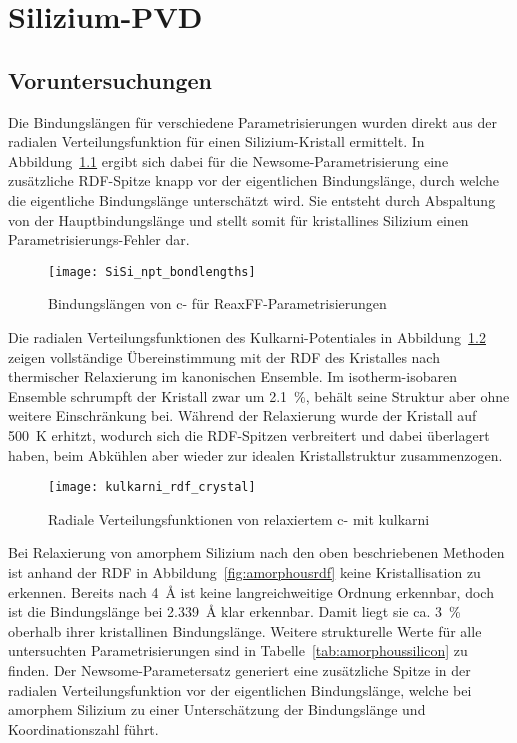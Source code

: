 \chapter{Silizium-PVD}
\label{appendix_silicon}


\section{Voruntersuchungen}

Die Bindungslängen für verschiedene Parametrisierungen wurden direkt aus der radialen Verteilungsfunktion für einen Silizium-Kristall ermittelt.
In Abbildung~\ref{fig:sisibondlengths} ergibt sich dabei für die Newsome-Parametrisierung eine zusätzliche RDF-Spitze knapp vor der eigentlichen Bindungslänge, durch welche die eigentliche Bindungslänge unterschätzt wird.
Sie entsteht durch Abspaltung von der Hauptbindungslänge und stellt somit für kristallines Silizium einen Para\-metri\-sierungs-Fehler dar.

\begin{figure}[!ht]
  \centering
  \texttt{[image: SiSi\_npt\_bondlengths]}
  \caption{Bindungslängen von c- für ReaxFF-Parametrisierungen}
  \label{fig:sisibondlengths}
\end{figure}

Die radialen Verteilungsfunktionen des Kulkarni-Potentiales in Abbildung~\ref{fig:kulkarnirdf} zeigen vollständige Übereinstimmung mit der RDF des Kristalles nach thermischer Relaxierung im kanonischen Ensemble.
Im isotherm-isobaren Ensemble schrumpft der Kristall zwar um \SI{2.1}{\percent}, behält seine Struktur aber ohne weitere Einschränkung bei.
Während der Relaxierung wurde der Kristall auf \SI{500}{\kelvin} erhitzt, wodurch sich die RDF-Spitzen verbreitert und dabei überlagert haben, beim Abkühlen aber wieder zur idealen Kristallstruktur zusammenzogen.

\begin{figure}[!ht]
  \centering
  \texttt{[image: kulkarni\_rdf\_crystal]}
  \caption[Radiale Verteilungsfunktionen von relaxiertem c-]{
    Radiale Verteilungsfunktionen von relaxiertem c- mit kulkarni
  }
  \label{fig:kulkarnirdf}
\end{figure}

Bei Relaxierung von amorphem Silizium nach den oben beschriebenen Methoden ist anhand der RDF in Abbildung~\ref{fig:amorphousrdf} keine Kristallisation zu erkennen.
Bereits nach \SI{4}{\angstrom} ist keine langreichweitige Ordnung erkennbar, doch ist die Bindungslänge bei \SI{2.339}{\angstrom} klar erkennbar.
Damit liegt sie ca. \SI{3}{\percent} oberhalb ihrer kristallinen Bindungslänge.
Weitere strukturelle Werte für alle untersuchten Parametrisierungen sind in Tabelle~\ref{tab:amorphoussilicon} zu finden.
Der Newsome-Parametersatz generiert eine zusätzliche Spitze in der radialen Verteilungsfunktion vor der eigentlichen Bindungslänge, welche bei amorphem Silizium zu einer Unterschätzung der Bindungslänge und Koordinationszahl führt.

